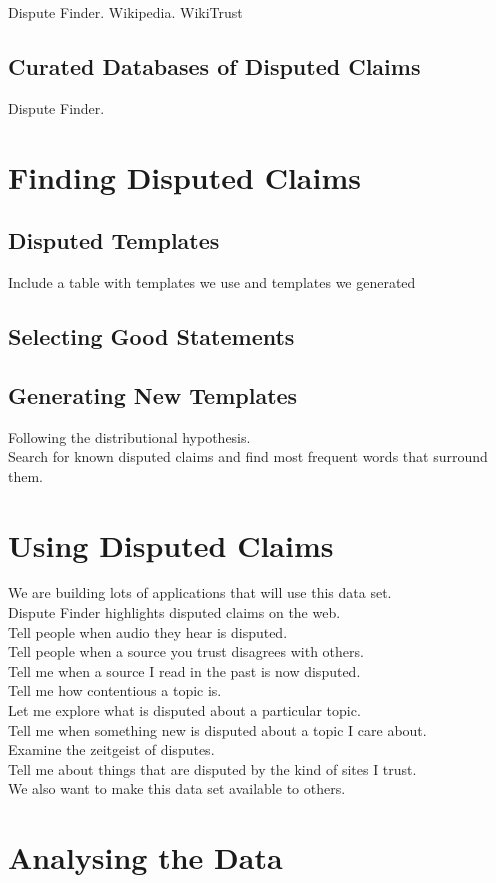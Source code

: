 \documentclass{www2010-submission}
\newcommand{\x}[1]{{\color{blue} #1}\\}
\begin{document}
\x{Dispute Finder. Wikipedia. WikiTrust}

\subsection{Curated Databases of Disputed Claims}

\x{Dispute Finder.}


\section{Finding Disputed Claims}

\subsection{Disputed Templates}

\x{Include a table with templates we use and templates we generated}

\subsection{Selecting Good Statements}

\subsection{Generating New Templates}

\x{Following the distributional hypothesis.}
\x{Search for known disputed claims and find most frequent words that surround them.}

\section{Using Disputed Claims}

\x{We are building lots of applications that will use this data set.}
\x{Dispute Finder highlights disputed claims on the web.}
\x{Tell people when audio they hear is disputed.}
\x{Tell people when a source you trust disagrees with others.}
\x{Tell me when a source I read in the past is now disputed.}
\x{Tell me how contentious a topic is.}
\x{Let me explore what is disputed about a particular topic.}
\x{Tell me when something new is disputed about a topic I care about.}
\x{Examine the zeitgeist of disputes.}
\x{Tell me about things that are disputed by the kind of sites I trust.}
\x{We also want to make this data set available to others.}

\section{Analysing the Data}
\end{document}
